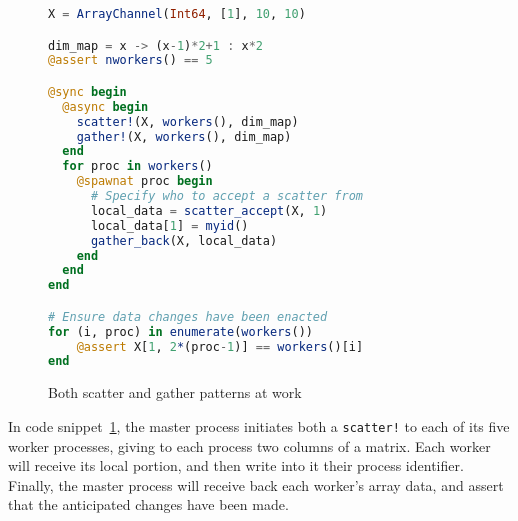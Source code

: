 \begin{figure}[htb]
	\begin{lstlisting}[language=Julia]
X = ArrayChannel(Int64, [1], 10, 10)

dim_map = x -> (x-1)*2+1 : x*2
@assert nworkers() == 5

@sync begin
  @async begin
	scatter!(X, workers(), dim_map)
	gather!(X, workers(), dim_map)
  end
  for proc in workers()
	@spawnat proc begin
  	  # Specify who to accept a scatter from
      local_data = scatter_accept(X, 1) 
      local_data[1] = myid()
      gather_back(X, local_data)
	end
  end
end

# Ensure data changes have been enacted
for (i, proc) in enumerate(workers())
	@assert X[1, 2*(proc-1)] == workers()[i]
end

	\end{lstlisting}
	\caption{Both scatter and gather patterns at work}
	\label{code:scatter-gather}
\end{figure}

In code snippet~\ref{code:scatter-gather}, the master process initiates both a \texttt{scatter!} to each of its five worker processes, giving to each process two columns of a matrix. Each worker will receive its local portion, and then write into it their process identifier. Finally, the master process will receive back each worker's array data, and assert that the anticipated changes have been made.
